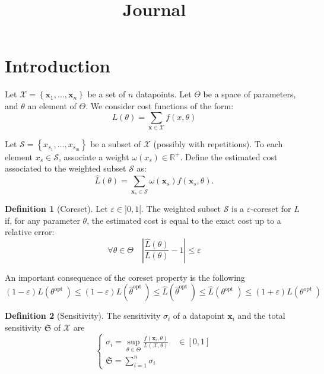 \documentclass{article}
\title{Journal}
\renewcommand{\epsilon}{\varepsilon}
\theoremstyle{definition}
\newtheorem{definition}{Definition}[section]
\begin{document}
	
	\maketitle
	
	\section{Introduction}
	
	Let $\mathcal{X}=\left\{\boldsymbol{x}_{1}, \ldots, \boldsymbol{x}_{n}\right\}$ be a set of $n$ datapoints. Let $\Theta$ be a space of parameters, and $\theta$ an element of $\Theta$. We consider cost functions of the form:
	$$
	L(\theta)=\sum_{\boldsymbol{x} \in \mathcal{X}} f(x, \theta)
	$$
	
	Let $\mathcal{S}=\left\{x_{s_{1}}, \ldots, x_{s_{m}}\right\}$ be a subset of $\mathcal{X}$ (possibly with repetitions). To each element $x_{s} \in \mathcal{S}$, associate a weight $\omega\left(x_{s}\right) \in \mathbb{R}^{+}$. Define the estimated cost associated to the weighted subset $\mathcal{S}$ as:
	$$
	\hat{L}(\theta)=\sum_{\boldsymbol{x}_{s} \in \mathcal{S}} \omega\left(\boldsymbol{x}_{s}\right) f\left(\boldsymbol{x}_{s}, \theta\right) .
	$$
	\begin{definition}[Coreset]
			Let $\epsilon \in {]}0,1{[}$. The weighted subset $\mathcal{S}$ is a $\epsilon$-coreset for $L$ if, for any parameter $\theta$, the estimated cost is equal to the exact cost up to a relative error:
		$$
		\forall \theta \in \Theta \quad\left|\frac{\hat{L}(\theta)}{L(\theta)}-1\right| \le \epsilon 
		$$
	\end{definition}

An important consequence of the coreset property is the following
$$
(1-\epsilon) L\left(\theta^{\text {opt }}\right) \le(1-\epsilon) L\left( \hat{\theta}^{\text {opt }}\right) \le \hat{L}\left( \hat{\theta}^{\text {opt }}\right) \le \hat{L}\left( \theta^{\text {opt }}\right) \le(1+\epsilon) L\left( \theta^{\text {opt }}\right)
$$

\begin{definition}[Sensitivity]
	The sensitivity $\sigma_i$ of a datapoint $\boldsymbol{x}_{i}$ and the total sensitivity $\mathfrak S$ of $\mathcal X$ are
	$$
	\begin{cases}
		\sigma_{i}=\sup _{\theta \in \Theta} \frac{f\left(\boldsymbol{x}_{i}, \theta\right)}{L(\mathcal{X}, \theta)} \quad \in[0,1]\\
			\mathfrak{S}=\sum_{i=1}^{n} \sigma_{i}
	\end{cases}
$$
\end{definition} 
\end{document}
